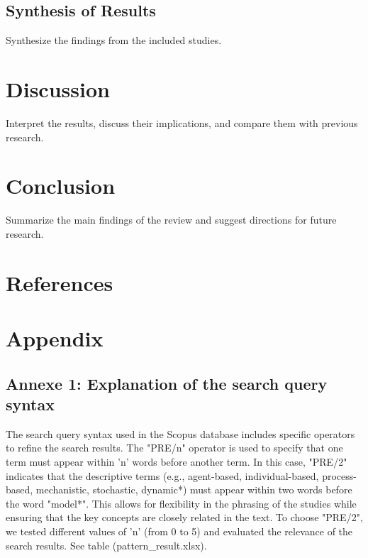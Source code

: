 \documentclass[a4paper,12pt]{article}
\begin{document}
\subsection{Synthesis of Results}
Synthesize the findings from the included studies.

\section{Discussion}
\label{sec:discussion}
Interpret the results, discuss their implications, and compare them with previous research.

\section{Conclusion}
\label{sec:conclusion}
Summarize the main findings of the review and suggest directions for future research.

\section*{References}



\section*{Appendix}
\subsection*{Annexe 1: Explanation of the search query syntax}
The search query syntax used in the Scopus database includes specific operators to refine the search results. The "PRE/n" operator is used to specify that one term must appear within 'n' words before another term. In this case, "PRE/2" indicates that the descriptive terms (e.g., agent-based, individual-based, process-based, mechanistic, stochastic, dynamic*) must appear within two words before the word "model*". This allows for flexibility in the phrasing of the studies while ensuring that the key concepts are closely related in the text.
To choose "PRE/2", we tested different values of 'n' (from 0 to 5) and evaluated the relevance of the search results. See table (pattern_result.xlsx).
\end{document}
